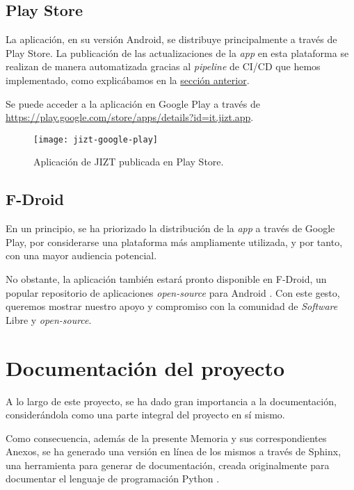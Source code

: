 \subsection{Play Store}

La aplicación, en su versión Android, se distribuye principalmente a través de Play Store. La publicación de las actualizaciones de la \emph{app} en esta plataforma se realizan de manera automatizada gracias al \emph{pipeline} de CI/CD que hemos implementado, como explicábamos en la \hyperref[subsec:ci-cd-app]{sección anterior}. 

Se puede acceder a la aplicación en Google Play a través de \\ \href{https://play.google.com/store/apps/details?id=it.jizt.app}{https://play.google.com/store/apps/details?id=it.jizt.app}.

\begin{figure}[h]
	\centering
	\texttt{[image: jizt-google-play]}
	\caption{Aplicación de JIZT publicada en Play Store.}
\end{figure}

\newpage

\subsection{F-Droid}

En un principio, se ha priorizado la distribución de la \emph{app} a través de Google Play, por considerarse una plataforma más ampliamente utilizada, y por tanto, con una mayor audiencia potencial.

No obstante, la aplicación también estará pronto disponible en F-Droid, un popular repositorio de aplicaciones \emph{open-source} para Android \cite{f-droid}. Con este gesto, queremos mostrar nuestro apoyo y compromiso con la comunidad de \emph{Software} Libre y \emph{open-source}.


\section{Documentación del proyecto}

A lo largo de este proyecto, se ha dado gran importancia a la documentación, considerándola como una parte integral del proyecto en sí mismo.

Como consecuencia, además de la presente Memoria y sus correspondientes Anexos, se ha generado una versión en línea de los mismos a través de Sphinx, una herramienta para generar de documentación, creada originalmente para documentar el lenguaje de programación Python \cite{sphinx-doc}.

